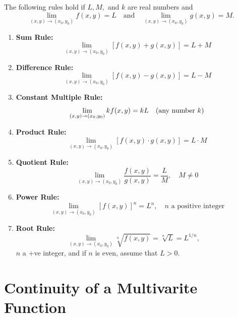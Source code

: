 \begin{theorem}
  The following rules hold if \( L, M, \) and \( k \) are real numbers and
  \[
    \lim_{(x, y) \to (x_0, y_0)} f(x, y) = L \quad \text{and} \quad \lim_{(x, y) \to (x_0, y_0)} g(x, y) = M.
  \]
  \begin{enumerate}
    \item \textbf{Sum Rule:} \\
      \[
        \lim_{(x, y) \to (x_0, y_0)} [f(x, y) + g(x, y)] = L + M
      \]

    \item \textbf{Difference Rule:} \\
      \[
        \lim_{(x, y) \to (x_0, y_0)} [f(x, y) - g(x, y)] = L - M
      \]

    \item \textbf{Constant Multiple Rule:} \\
      \[
        \lim_{(x, y) \to (x_0, y_0)} kf(x, y) = kL \quad \text{(any number \( k \))}
      \]

    \item \textbf{Product Rule:} \\
      \[
        \lim_{(x, y) \to (x_0, y_0)} [f(x, y) \cdot g(x, y)] = L \cdot M
      \]

    \item \textbf{Quotient Rule:} \\
      \[
        \lim_{(x, y) \to (x_0, y_0)} \frac{f(x, y)}{g(x, y)} = \frac{L}{M}, \quad M \ne 0
      \]

    \item \textbf{Power Rule:} \\
      \[
        \lim_{(x, y) \to (x_0, y_0)} [f(x, y)]^n = L^n, \quad n \text{ a positive integer}
      \]

    \item \textbf{Root Rule:} \\
      \[
        \lim_{(x, y) \to (x_0, y_0)} \sqrt[n]{f(x, y)} = \sqrt[n]{L} = L^{1/n},
        \quad
      \]
      \(n\) a \(+\)ve integer, and if \( n \) is even,
      assume that  \(L > 0\).
  \end{enumerate}
\end{theorem}

\section{Continuity of a Multivarite Function}
\label{sec:continuity-of-a-multivarite-function}

